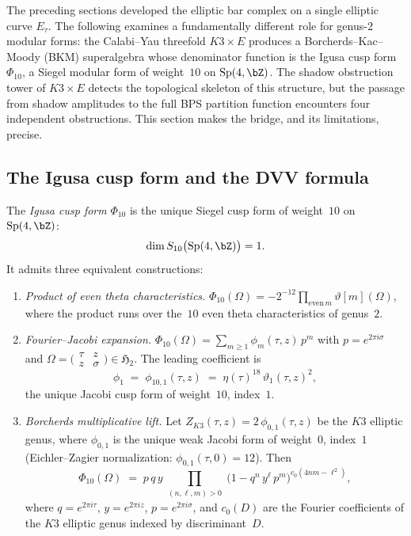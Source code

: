 The preceding sections developed the elliptic bar complex on a
single elliptic curve $E_\tau$. The following examines a fundamentally
different role for genus-$2$ modular forms: the Calabi--Yau
threefold $K3 \times E$ produces a Borcherds--Kac--Moody (BKM)
superalgebra whose denominator function is the Igusa cusp form
$\Phi_{10}$, a Siegel modular form of weight~$10$ on
$\operatorname{Sp}(4, \bZ)$. The shadow obstruction tower
of $K3 \times E$ detects the topological skeleton of this
structure, but the passage from shadow amplitudes to the full
BPS partition function encounters four independent obstructions.
This section makes the bridge, and its limitations, precise.

\subsection{The Igusa cusp form and the DVV formula}
\label{subsec:igusa-dvv}

\begin{definition}
\label{def:igusa-cusp-form}
The \emph{Igusa cusp form} $\Phi_{10}$ is the unique Siegel
cusp form of weight~$10$ on $\operatorname{Sp}(4,\bZ)$:
\[
\dim S_{10}\bigl(\operatorname{Sp}(4,\bZ)\bigr) = 1.
\]
It admits three equivalent constructions:
\begin{enumerate}[label=\textup{(\roman*)}]
\item \emph{Product of even theta characteristics.}
$\Phi_{10}(\Omega) = -2^{-12} \prod_{\text{even}\,m}
\vartheta[m](\Omega)$, where the product runs over the~$10$
even theta characteristics of genus~$2$.
\item \emph{Fourier--Jacobi expansion.}
$\Phi_{10}(\Omega) = \sum_{m \geq 1}
\phi_m(\tau,z)\,p^m$ with $p = e^{2\pi i \sigma}$ and
$\Omega = \bigl(\begin{smallmatrix} \tau & z \\ z & \sigma
\end{smallmatrix}\bigr) \in \mathfrak{H}_2$.
The leading coefficient is
\begin{equation}\label{eq:phi-10-1}
\phi_1 \;=\; \phi_{10,1}(\tau,z)
\;=\; \eta(\tau)^{18}\,\vartheta_1(\tau,z)^2,
\end{equation}
the unique Jacobi cusp form of weight~$10$, index~$1$.
\item \emph{Borcherds multiplicative lift.}
Let $Z_{K3}(\tau,z) = 2\,\phi_{0,1}(\tau,z)$ be the
$K3$ elliptic genus, where $\phi_{0,1}$ is the unique
weak Jacobi form of weight~$0$, index~$1$ (Eichler--Zagier
normalization: $\phi_{0,1}(\tau,0) = 12$). Then
\begin{equation}\label{eq:borcherds-lift}
\Phi_{10}(\Omega) \;=\; p\,q\,y \prod_{\substack{
(n,\ell,m) > 0}}
\bigl(1 - q^n\,y^\ell\,p^m\bigr)^{c_0(4nm - \ell^2)},
\end{equation}
where $q = e^{2\pi i \tau}$, $y = e^{2\pi i z}$,
$p = e^{2\pi i \sigma}$, and $c_0(D)$ are the Fourier
coefficients of the $K3$ elliptic genus indexed by
discriminant~$D$.
\end{enumerate}
\end{definition}

